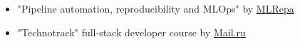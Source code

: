 \begin{itemize}
    \item "Pipeline automation, reproducibility and MLOps" by \href{https://ml-repa.ru/reproducibility-pipelines-automation-mlops}{\underline{MLRepa}}
	\item "Technotrack" full-stack developer course by \href{https://track.mail.ru/}{\underline{Mail.ru}}
\end{itemize}
